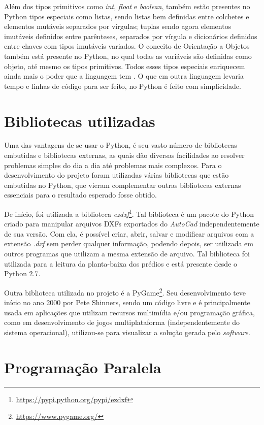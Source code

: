 \documentclass[
	12pt,				%
	twoside,			%
	a4paper,			%
	english,			%
	french,				%
	spanish,			%
	brazil				%
	]{abntex2}
\begin{document}
Além dos tipos primitivos como \emph{int}, \emph{float} e
\emph{boolean}, também estão presentes no Python tipos especiais como
listas, sendo listas bem definidas entre colchetes e elementos mutáveis
separados por vírgulas; tuplas sendo agora elementos imutáveis definidos
entre parênteses, separados por vírgula e dicionários definidos entre
chaves com tipos imutáveis variados. O conceito de Orientação a Objetos
também está presente no Python, no qual todas as variáveis são definidas
como objeto, até mesmo os tipos primitivos. Todos esses tipos especiais
enriquecem ainda mais o poder que a linguagem tem \cite{GUIDO}. O que em
outra linguagem levaria tempo e linhas de código para ser feito, no
Python é feito com simplicidade.

\section{Bibliotecas utilizadas}\label{bibliotecas-utilizadas}

Uma das vantagens de se usar o Python, é seu vasto número de bibliotecas
embutidas e bibliotecas externas, as quais dão diversas facilidades ao
resolver problemas simples do dia a dia até problemas mais complexos.
Para o desenvolvimento do projeto foram utilizadas várias bibliotecas
que estão embutidas no Python, que vieram complementar outras
bibliotecas externas essenciais para o resultado esperado fosse obtido.

De início, foi utilizada a biblioteca \emph{ezdxf}\footnote{\url{https://pypi.python.org/pypi/ezdxf}}.
Tal biblioteca é um pacote do Python criado para manipular arquivos DXFs
exportados do \emph{AutoCad} independentemente de sua versão. Com ela, é
possível criar, abrir, salvar e modificar arquivos com a extensão
\emph{.dxf} sem perder qualquer informação, podendo depois, ser
utilizada em outros programas que utilizam a mesma extensão de arquivo.
Tal biblioteca foi utilizada para a leitura da planta-baixa dos prédios
e está presente desde o Python 2.7.

Outra biblioteca utilizada no projeto é a PyGame\footnote{\url{https://www.pygame.org/}}.
Seu desenvolvimento teve início no ano 2000 por Pete Shinners, sendo um
código livre e é principalmente usada em aplicações que utilizam
recursos multimídia e/ou programação gráfica, como em desenvolvimento de
jogos multiplataforma (independentemente do sistema operacional),
utilizou-se para visualizar a solução gerada pelo \emph{software}.

\section{Programação Paralela}\label{programauxe7uxe3o-paralela}
\end{document}
